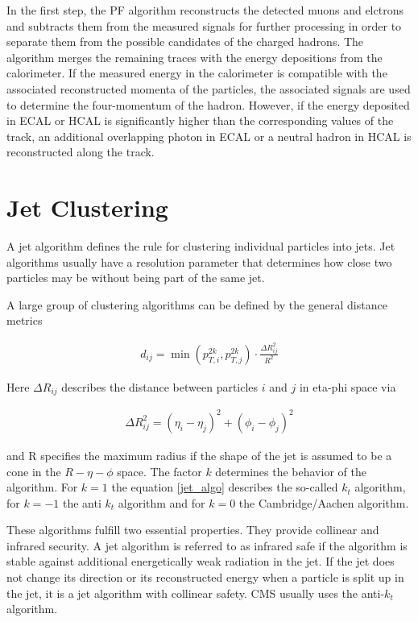 \documentclass[12pt, a4paper]{thesis}
\begin{document}
In the first step, the PF algorithm reconstructs the detected muons
and elctrons and subtracts them from the measured signals for further
processing in order to separate them from the possible candidates of
the charged hadrons. The algorithm merges the remaining traces with
the energy depositions from the calorimeter. If the measured energy in
the calorimeter is compatible with the associated reconstructed
momenta of the particles, the associated signals are used to determine
the four-momentum of the hadron. However, if the energy deposited in
ECAL or HCAL is significantly higher than the corresponding values of
the track, an additional overlapping photon in ECAL or a neutral
hadron in HCAL is reconstructed along the track.

\clearpage
\section{Jet Clustering}
\label{sec:orgfca5f43}

A jet algorithm defines the rule for clustering individual particles
into jets. Jet algorithms usually have a resolution parameter that
determines how close two particles may be without being part of the
same jet.

A large group of clustering algorithms can be defined by the general
distance metrics

\begin{align}
  d_{ij} = \min(p^{2k}_{T,i}, p^{2k}_{T,j}) \cdot \frac{\Delta R^{2}_{ij}}{R^{2}} \label{jet_algo}
\end{align}

Here \(\Delta R_{ij}\) describes the distance between particles $i$
and $j$ in eta-phi space via

\begin{align}
  \Delta R_{ij}^{2} = (\eta_{i} - \eta_{j})^{2} + (\phi_{i} - \phi_{j})^{2}
\end{align}

and R specifies the maximum radius if the shape of the jet is assumed
to be a cone in the $R-\eta-\phi$ space. The factor \(k\) determines
the behavior of the algorithm. For \(k=1\) the equation
\eqref{jet_algo} describes the so-called \(k_t\) algorithm, for
\(k=-1\) the anti \(k_t\) algorithm and for \(k=0\) the
Cambridge/Aachen algorithm.

These algorithms fulfill two essential properties. They provide
collinear and infrared security. A jet algorithm is referred to as
infrared safe if the algorithm is stable against additional
energetically weak radiation in the jet. If the jet does not change
its direction or its reconstructed energy when a particle is split up
in the jet, it is a jet algorithm with collinear safety. CMS usually
uses the anti-\(k_t\) algorithm.
\end{document}
